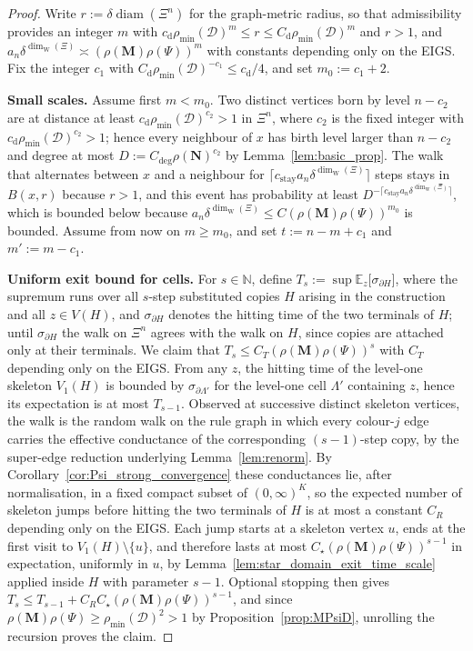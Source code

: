 \documentclass{article}
\theoremstyle{plain}
\theoremstyle{definition}
\newcommand{\dist}{\mathrm{d}}
\newcommand{\dimwalk}{\dim_\mathrm{W}}
\begin{document}
\begin{proof}
%
Write $r:=\delta\operatorname{diam}(\Xi^n)$ for the graph-metric radius, so that admissibility provides an integer $m$ with $c_{\dist}\rho_{\min}(\mathcal D)^m\le r\le C_{\dist}\rho_{\min}(\mathcal D)^m$ and $r>1$, and $a_n\delta^{\dimwalk(\Xi)}\asymp(\rho(\mathbf M)\rho(\Psi))^m$ with constants depending only on the EIGS.
Fix the integer $c_1$ with $C_{\dist}\rho_{\min}(\mathcal D)^{-c_1}\le c_{\dist}/4$, and set $m_0:=c_1+2$.

\textbf{Small scales.}
Assume first $m<m_0$.
Two distinct vertices born by level $n-c_2$ are at distance at least $c_{\dist}\rho_{\min}(\mathcal D)^{c_2}>1$ in $\Xi^n$, where $c_2$ is the fixed integer with $c_{\dist}\rho_{\min}(\mathcal D)^{c_2}>1$; hence every neighbour of $x$ has birth level larger than $n-c_2$ and degree at most $D:=C_{\deg}\rho(\mathbf N)^{c_2}$ by Lemma~\ref{lem:basic_prop}.
The walk that alternates between $x$ and a neighbour for $\lceil c_{\mathrm{stay}}a_n\delta^{\dimwalk(\Xi)}\rceil$ steps stays in $B(x,r)$ because $r>1$, and this event has probability at least $D^{-\lceil c_{\mathrm{stay}}a_n\delta^{\dimwalk(\Xi)}\rceil}$, which is bounded below because $a_n\delta^{\dimwalk(\Xi)}\le C(\rho(\mathbf M)\rho(\Psi))^{m_0}$ is bounded.
Assume from now on $m\ge m_0$, and set $t:=n-m+c_1$ and $m':=m-c_1$.

\textbf{Uniform exit bound for cells.}
For $s\in\mathbb N$, define $T_s:=\sup\mathbb E_z\bigl[\sigma_{\partial H}\bigr]$, where the supremum runs over all $s$-step substituted copies $H$ arising in the construction and all $z\in V(H)$, and $\sigma_{\partial H}$ denotes the hitting time of the two terminals of $H$; until $\sigma_{\partial H}$ the walk on $\Xi^n$ agrees with the walk on $H$, since copies are attached only at their terminals.
We claim that $T_s\le C_T(\rho(\mathbf M)\rho(\Psi))^{s}$ with $C_T$ depending only on the EIGS.
From any $z$, the hitting time of the level-one skeleton $V_1(H)$ is bounded by $\sigma_{\partial\Lambda'}$ for the level-one cell $\Lambda'$ containing $z$, hence its expectation is at most $T_{s-1}$.
Observed at successive distinct skeleton vertices, the walk is the random walk on the rule graph in which every colour-$j$ edge carries the effective conductance of the corresponding $(s-1)$-step copy, by the super-edge reduction underlying Lemma~\ref{lem:renorm}.
By Corollary~\ref{cor:Psi_strong_convergence} these conductances lie, after normalisation, in a fixed compact subset of $(0,\infty)^K$, so the expected number of skeleton jumps before hitting the two terminals of $H$ is at most a constant $C_R$ depending only on the EIGS.
Each jump starts at a skeleton vertex $u$, ends at the first visit to $V_1(H)\setminus\{u\}$, and therefore lasts at most $C_\star(\rho(\mathbf M)\rho(\Psi))^{s-1}$ in expectation, uniformly in $u$, by Lemma~\ref{lem:star_domain_exit_time_scale} applied inside $H$ with parameter $s-1$.
Optional stopping then gives $T_s\le T_{s-1}+C_RC_\star(\rho(\mathbf M)\rho(\Psi))^{s-1}$, and since $\rho(\mathbf M)\rho(\Psi)\ge\rho_{\min}(\mathcal D)^2>1$ by Proposition~\ref{prop:MPsiD}, unrolling the recursion proves the claim.


\end{proof}
\end{document}
